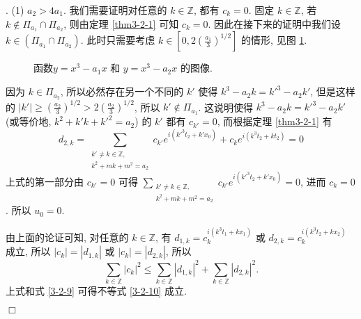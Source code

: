 \documentclass[master]{cugthesis}
\newcommand\Z{\ensuremath{\mathbb{Z}}}
\newenvironment{proof}{{\noindent\itshape 证明}.}{\hfill $\Box$\par}
\begin{document}
\begin{proof}
     (1) $a_2>4a_1$. 我们需要证明对任意的 $k\in\Z$, 都有 $c_k=0$. 固定 $k\in \Z$, 若 $k\notin \Pi_{a_1}\cap \Pi_{a_2}$, 则由定理 \ref{thm3-2-1} 可知 $c_k=0$. 因此在接下来的证明中我们设 $k\in  \left(\Pi_{a_1}\cap \Pi_{a_2}\right)$. 此时只需要考虑 $k\in \left[0, 2\left(\frac{a_1}{3}\right)^{1 /2}\right]$ 的情形, 见图 \ref{fig6}.
          \begin{figure}[ht]
        \centering
        \caption{函数$y=x^3-a_1x$ 和 $y=x^3-a_2 x$ 的图像.}
        \label{fig6}
    \end{figure}
     因为 $k\in \Pi_{a_2} $, 所以必然存在另一个不同的 $k'$ 使得 $k^3-a_2k={k'}^3-a_2k'$, 但是这样的 $|k'|\ge\left(\frac{a_2}{3}\right)^{1 /2}>2\left(\frac{a_2}{3}\right)^{1 /2}$, 所以 $k'\notin \Pi_{a_1}$. 这说明使得 $k^3-a_2k=k'^3-a_2k'$ (或等价地, $k^2+k'k+k'^2=a_2$) 的 $k'$ 都有 $c_{k'}=0$, 而根据定理 \ref{thm3-2-1} 有
     \begin{equation*}
         d_{2,k}=\sum\limits_{\substack{k'\neq k\in \Z,\\ k^2+mk+m^2=a_2}} c_{k'}e^{i(k'^3t_2+k'x_0)}+c_k e^{i(k^3t_2+kt_2)}=0
     \end{equation*}
     上式的第一部分由 $c_{k'}=0$ 可得 $\sum_{\substack{k'\neq k\in \Z,\\ k^2+mk+m^2=a_2}} c_{k'}e^{i(k'^3t_2+k'x_0)}=0$, 进而 $c_k=0$. 所以 $u_0=0$.
  
  由上面的论证可知, 对任意的 $k\in \Z$, 有 $d_{1,k}=c_k^{i(k^3t_1+kx_1)}$ 或 $d_{2,k}=c_k^{i(k^3t_2+kx_2)}$ 成立, 所以 $|c_k|=|d_{1,k}|$ 或 $|c_k|=|d_{2,k}|$, 所以
  \begin{equation*}
      \sum_{k\in \Z}|c_k|^2\le \sum_{k\in \Z}|d_{1,k}|^2+\sum_{k\in\Z}|d_{2,k}|^2.
  \end{equation*}
  上式和式 \eqref{3-2-9} 可得不等式 \eqref{3-2-10} 成立.   
  

\end{proof}
\end{document}
